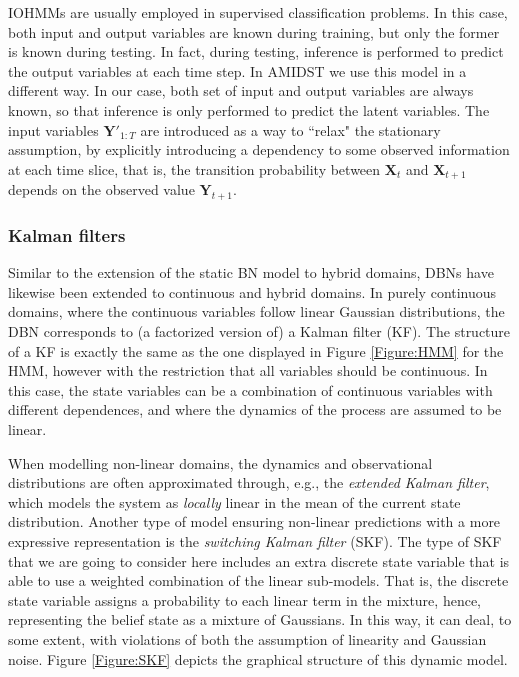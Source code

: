 IOHMMs are usually employed in supervised classification problems. In this case, both input and output variables are known during training, but only the former is known during testing. In fact, during testing, inference is performed to predict the output variables at each time step. In AMIDST we use this model in a different way. In our case, both set of input and output variables are always known, so that inference is only performed to predict the latent variables. The input variables $\bm Y'_{1:T}$ are introduced as a way to ``relax" the stationary assumption, by explicitly introducing a dependency to some observed information at each time slice, that is, the transition probability between $\bm X_t$ and $\bm X_{t+1}$ depends on the observed value $\bm Y_{t+1}$. 

\subsubsection{Kalman filters}\label{SubSubSection:KFs}

Similar to the extension of the static BN model to hybrid domains, DBNs have likewise been extended to continuous and hybrid domains. In purely continuous domains, where the continuous variables follow linear Gaussian distributions, the DBN corresponds to (a factorized version of) a Kalman filter (KF). The structure of a KF is exactly the same as the one displayed in Figure \ref{Figure:HMM} for the HMM, however with the restriction that all variables should be continuous. In this case, the state variables can be a combination of continuous variables with different dependences, and where the dynamics of the process are assumed to be linear. 

When modelling non-linear domains, the dynamics and observational distributions are often approximated through, e.g., the \textit{extended Kalman filter}, which models the system as \textit{locally} linear in the mean of the current state distribution. Another type of model ensuring non-linear predictions with a more expressive representation is the \textit{switching Kalman filter} (SKF). The type of SKF that we are going to consider here includes an extra discrete state variable that is able to use a weighted combination of the linear sub-models. That is, the discrete state variable assigns a probability to each linear term in the mixture, hence, representing the belief state as a mixture of Gaussians. In this way, it can deal, to some extent, with violations of both the assumption of linearity and Gaussian noise. Figure \ref{Figure:SKF} depicts the graphical structure of this dynamic model.

